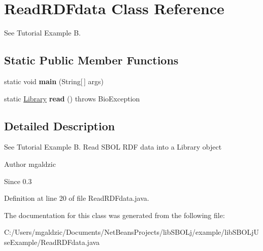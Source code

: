 \hypertarget{classlib_s_b_o_lj_use_example_1_1_read_r_d_fdata}{
\section{ReadRDFdata Class Reference}
\label{classlib_s_b_o_lj_use_example_1_1_read_r_d_fdata}
}


See Tutorial Example B.  


\subsection*{Static Public Member Functions}
\begin{DoxyCompactItemize}
\item 
\hypertarget{classlib_s_b_o_lj_use_example_1_1_read_r_d_fdata_a8b260eecbaabcef8473fd87ada040682}{
static void {\bfseries main} (String\mbox{[}$\,$\mbox{]} args)}
\label{classlib_s_b_o_lj_use_example_1_1_read_r_d_fdata_a8b260eecbaabcef8473fd87ada040682}

\item 
\hypertarget{classlib_s_b_o_lj_use_example_1_1_read_r_d_fdata_a3162d278d0d75a2bbf1c6e3043952e53}{
static \hyperlink{classorg_1_1sbolstandard_1_1lib_s_b_o_lj_1_1_library}{Library} {\bfseries read} ()  throws BioException}
\label{classlib_s_b_o_lj_use_example_1_1_read_r_d_fdata_a3162d278d0d75a2bbf1c6e3043952e53}

\end{DoxyCompactItemize}


\subsection{Detailed Description}
See Tutorial Example B. Read SBOL RDF data into a Library object \begin{DoxyAuthor}{Author}
mgaldzic 
\end{DoxyAuthor}
\begin{DoxySince}{Since}
0.3 
\end{DoxySince}


Definition at line 20 of file ReadRDFdata.java.



The documentation for this class was generated from the following file:\begin{DoxyCompactItemize}
\item 
C:/Users/mgaldzic/Documents/NetBeansProjects/libSBOLj/example/libSBOLjUseExample/ReadRDFdata.java\end{DoxyCompactItemize}
